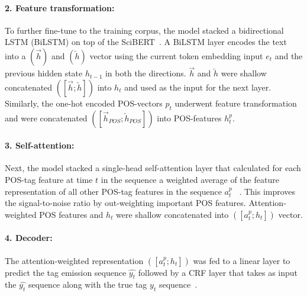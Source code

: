 \documentclass[11pt]{article}
\begin{document}
\paragraph{2. Feature transformation:}
%
To further fine-tune to the training corpus, the model stacked a bidirectional LSTM (BiLSTM) on top of the SciBERT~\cite{hochreiter1997long}.
A BiLSTM layer encodes the text into a $(\overrightarrow{h})$ and $(\overleftarrow{h})$  vector using the current token embedding input $e_{t}$ and the previous hidden state $h_{t-1}$ in both the directions.
$\overrightarrow{h}$ and $\overleftarrow{h}$ were shallow concatenated $([\overrightarrow{h}; \overleftarrow{h}])$ into $h_{t}$ and used as the input for the next layer.
Similarly, the one-hot encoded POS-vectors $p_{t}$ underwent feature transformation and were concatenated $([\overrightarrow{h}_{POS}; \overleftarrow{h}_{POS}])$ into POS-features $h^{p}_{t}$.
%
\paragraph{3. Self-attention: }
%
Next, the model stacked a single-head self-attention layer that calculated for each POS-tag feature at time $t$ in the sequence a weighted average of the feature representation of all other POS-tag features in the sequence $a^{p}_{t}$ ~\cite{vaswani2017attention}.
This improves the signal-to-noise ratio by out-weighting important POS features.
Attention-weighted POS features and $h_{t}$ were shallow concatenated into $([a^{p}_{t}; h_{t}])$ vector.
%
\paragraph{4. Decoder:}
%
The attention-weighted representation $([a^{p}_{t}; h_{t}])$ was fed to a linear layer to predict the tag emission sequence $\hat{y_{t}}$ followed by a CRF layer that takes as input the $\hat{y_{t}}$ sequence along with the true tag $y_{t}$ sequence~\cite{huang2015bidirectional}.
%
%
%
\end{document}
